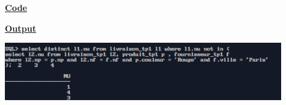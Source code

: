 \newpage
{}

\textbf{\underline{Code}}


\vspace{1cm}
\textbf{\underline{Output}}
\vspace{1cm}
\begin{center}
    \includegraphics[width=0.9\textwidth]{Questions/q24/q24.png}
\end{center}


